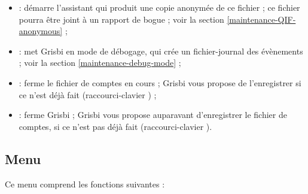 \begin{itemize}
	\item {} : démarre l'assistant qui produit une copie anonymée de ce fichier ; ce fichier pourra être joint à un rapport de bogue ; voir la section \vref{maintenance-QIF-anonymous} ;	
	\item {} : met Grisbi en mode de débogage, qui crée un fichier-journal des évènements ; voir la section \vref{maintenance-debug-mode} ; 	
	\item {} : ferme le fichier de comptes en cours ; Grisbi vous propose de l'enregistrer si ce n'est déjà fait (raccourci-clavier ) ;
	\item {} : ferme Grisbi ; Grisbi vous propose auparavant d'enregistrer le fichier de comptes, si ce n'est pas déjà fait (raccourci-clavier ).
\end{itemize}


\subsection{Menu \label{home-menus-edit}}

Ce menu comprend les fonctions suivantes :

